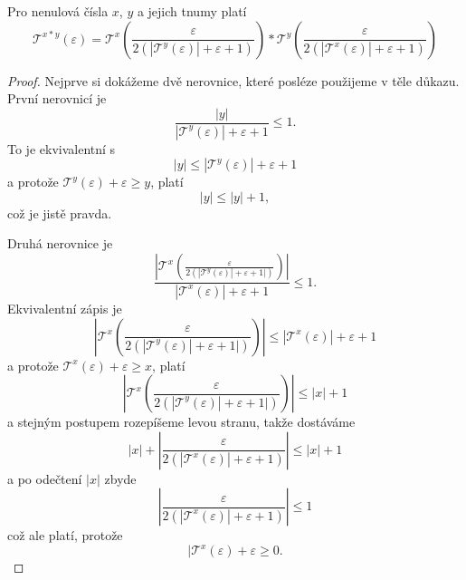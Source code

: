 \begin{theorem}\label{vet:soucin_dvou_tnumu}
Pro nenulová čísla $x$, $y$ a jejich tnumy platí
\begin{equation}
\mathcal{T}^{x*y}(\varepsilon)=\mathcal{T}^x\left(\frac{\varepsilon}{2(|\mathcal{T}^y(\varepsilon)| + \varepsilon + 1)}\right)*\mathcal{T}^y\left(\frac{\varepsilon}{2(|\mathcal{T}^x(\varepsilon)| + \varepsilon + 1)}\right)
\end{equation}
\begin{proof}
Nejprve si dokážeme dvě nerovnice, které posléze použijeme v těle důkazu.
První nerovnicí je 
\begin{equation}\label{duk:soucin_prvni}
\frac{|y|}{|\mathcal{T}^y(\varepsilon)| + \varepsilon + 1}\leq 1.
\end{equation}
To je ekvivalentní s
\begin{equation}
|y|\leq |\mathcal{T}^y(\varepsilon)|+\varepsilon+1
\end{equation}
a protože $\mathcal{T}^y(\varepsilon)+\varepsilon\geq y$, platí
\begin{equation}
|y|\leq |y|+1,
\end{equation}
což je jistě pravda. 

Druhá nerovnice je
\begin{equation}\label{duk:soucin_druha}
\frac{|\mathcal{T}^x(\frac{\varepsilon}{2(|\mathcal{T}^y(\varepsilon)|+\varepsilon+1|)})|}{|\mathcal{T}^x(\varepsilon)|+\varepsilon+1}\leq 1.
\end{equation}
Ekvivalentní zápis je
\begin{equation}
|\mathcal{T}^x(\frac{\varepsilon}{2(|\mathcal{T}^y(\varepsilon)|+\varepsilon+1|)})|\leq |\mathcal{T}^x(\varepsilon)|+\varepsilon+1
\end{equation}
a protože $\mathcal{T}^x(\varepsilon)+\varepsilon\geq x$, platí
\begin{equation}
|\mathcal{T}^x(\frac{\varepsilon}{2(|\mathcal{T}^y(\varepsilon)|+\varepsilon+1|)})|\leq |x|+1
\end{equation}
a stejným postupem rozepíšeme levou stranu, takže dostáváme
\begin{equation}
|x|+|\frac{\varepsilon}{2(|\mathcal{T}^x(\varepsilon)|+\varepsilon+1)}|\leq |x|+1
\end{equation}
a po odečtení $|x|$ zbyde
\begin{equation}
|\frac{\varepsilon}{2(|\mathcal{T}^x(\varepsilon)|+\varepsilon+1)}|\leq 1
\end{equation}
což ale platí, protože
\begin{equation}
|\mathcal{T}^x(\varepsilon)+\varepsilon\geq 0.
\end{equation}


\end{proof}
\end{theorem}
